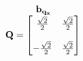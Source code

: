 \documentclass[preview]{standalone}
\begin{document}
\begin{align*}
\begin{array}{c}\begin{matrix}\hspace{1cm} \mathbf{b_{q_x}}  \quad \hspace{0.6cm} \end{matrix} \\ \mathbf{Q} = \begin{bmatrix} \frac{\sqrt{2}}{2} & \frac{\sqrt{2}}{2} \\ \\-\frac{\sqrt{2}}{2} &  \frac{\sqrt{2}}{2} \end{bmatrix} \end{array}
\end{align*}
\end{document}
